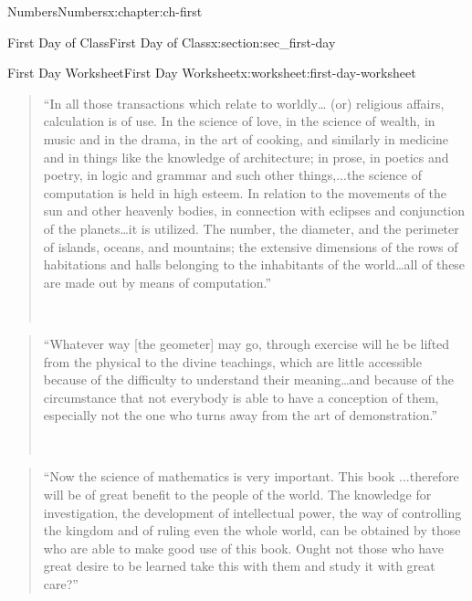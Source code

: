 \documentclass[twoside,10pt,]{book}
\numberwithin{equation}{chapter}
\begin{document}
\begin{chapterptx}{Numbers}{}{Numbers}{}{}{x:chapter:ch-first}
\begin{sectionptx}{First Day of Class}{}{First Day of Class}{}{}{x:section:sec_first-day}
\begin{worksheet-subsection}{First Day Worksheet}{}{First Day Worksheet}{}{}{x:worksheet:first-day-worksheet}
\begin{quote}
``In all those transactions which relate to worldly… (or)  religious affairs, calculation is of use.  In the science of love, in the science of wealth, in music and in the drama, in the art of cooking, and similarly in medicine and in things like the knowledge of architecture; in prose, in poetics and poetry, in logic and grammar and such other things,...the science of computation is held in high esteem.  In relation to the movements  of the sun and other heavenly bodies, in connection with eclipses and conjunction of the planets…it is utilized.  The number, the diameter, and the  perimeter of islands, oceans, and mountains; the extensive dimensions of the rows of habitations and halls belonging to the inhabitants of the world…all of   these are made out by means of computation.''%
\nopagebreak\par%
\hfill{}\\\par
\end{quote}
\begin{quote}%
``Whatever way [the geometer] may go, through exercise will he be lifted from the physical to the divine teachings, which are little accessible because of the difficulty to understand their meaning…and because of the circumstance that not everybody is able to have a conception of them, especially not the one who turns away from the art of demonstration.''%
\nopagebreak\par%
\hfill{}\\\par
\end{quote}
\clearpage
\begin{quote}%
``Now the science of mathematics is very important.  This book ...therefore will be of great benefit to the people of the world.  The knowledge for investigation, the development of intellectual power, the way of controlling the kingdom and of ruling even  the whole world, can be obtained by those who are able to make good use of this book.  Ought not those who have great desire to be learned take this with them and study it with great care?''%

\end{quote}
\end{worksheet-subsection}
\end{sectionptx}
\end{chapterptx}
\end{document}
